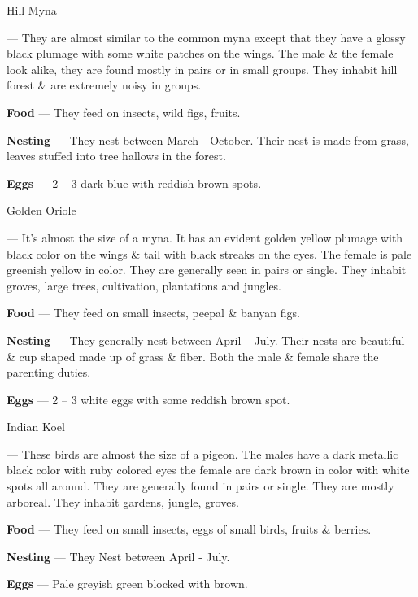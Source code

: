 \begin{bird}{Hill Myna}

 --- They are almost similar to the common myna except that they have a glossy black plumage with some white patches on the wings. The male \& the female look alike, they are found mostly in pairs or in small groups. They inhabit hill forest \& are extremely noisy in groups. 

{\large\bf Food} --- They feed on insects, wild figs, fruits.

{\large\bf Nesting} --- They nest between March - October. Their nest is made from grass, leaves stuffed into tree hallows in the forest.

{\large\bf Eggs} --- 2 -- 3 dark blue with reddish brown spots.
\end{bird}

\begin{bird}{Golden Oriole}

 --- It's almost the size of a myna. It has an evident golden yellow plumage with black color on the wings \& tail with black streaks on the eyes. The female is pale greenish yellow in color. They are generally seen in pairs or single. They inhabit groves, large trees, cultivation, plantations and jungles.

{\large\bf Food} --- They feed on small insects, peepal \& banyan figs.

{\large\bf Nesting} --- They generally nest between April -- July. Their nests are beautiful \& cup shaped made up of grass \& fiber. Both the male \& female share the parenting duties.

{\large\bf Eggs} --- 2 -- 3 white eggs with some reddish brown spot.
\end{bird}

\begin{bird}{Indian Koel}

 --- These birds are almost the size of a pigeon. The males have a dark metallic black color with ruby colored eyes the female are dark brown in color with white spots all around. They are generally found in pairs or single. They are mostly arboreal. They inhabit gardens, jungle, groves.

{\large\bf Food} --- They feed on small insects, eggs of small birds, fruits \& berries. 

{\bf Nesting} --- They Nest between April - July.

{\bf Eggs} --- Pale greyish green blocked with brown.
\end{bird}

